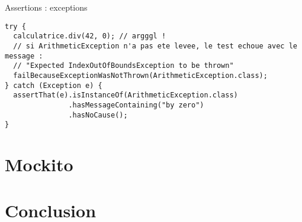 \documentclass[compress]{beamer}%
\begin{document}
\begin{frame}[containsverbatim]{Assertions : exceptions}
	
	\begin{lstlisting}
try {
  calculatrice.div(42, 0); // argggl !
  // si ArithmeticException n'a pas ete levee, le test echoue avec le message : 
  // "Expected IndexOutOfBoundsException to be thrown"
  failBecauseExceptionWasNotThrown(ArithmeticException.class);
} catch (Exception e) {
  assertThat(e).isInstanceOf(ArithmeticException.class)
               .hasMessageContaining("by zero")
               .hasNoCause();
}
	\end{lstlisting}
\end{frame}



\section{Mockito}

\section{Conclusion}
\end{document}
